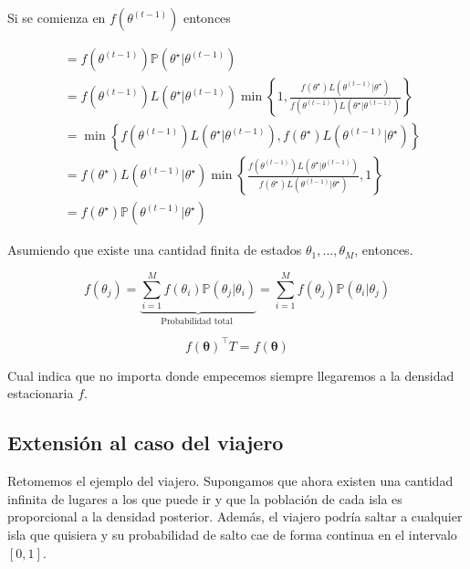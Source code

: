 \documentclass[
  12pt,
]{book}
\theoremstyle{definition}
\theoremstyle{definition}
\theoremstyle{definition}
\theoremstyle{definition}
\theoremstyle{remark}
\begin{document}
Si se comienza en \(f\left(\theta^{(t-1)}\right)\) entonces

\begin{align}
&= f\left(\theta^{(t-1)}\right) \mathbb{P}\left(\theta^{\star} | \theta^{(t-1)}\right) \\
&= f\left(\theta^{(t-1)}\right) L\left(\theta^{\star} | \theta^{(t-1)}\right) \min \left\{1, \frac{f\left(\theta^{\star}\right) L\left(\theta^{(t-1)} | \theta^{\star}\right)}{f\left(\theta^{(t-1)}\right) L\left(\theta^{\star} | \theta^{(t-1)}\right)}\right\} \\
&=\min \left\{f\left(\theta^{(t-1)}\right) L\left(\theta^{\star} | \theta^{(t-1)}\right), f\left(\theta^{\star}\right) L\left(\theta^{(t-1)} | \theta^{\star}\right)\right\} \\
&= f\left(\theta^{\star}\right) L\left(\theta^{(t-1)} | \theta^{\star}\right) \min \left\{\frac{f\left(\theta^{(t-1)}\right) L\left(\theta^{\star} | \theta^{(t-1)}\right)}{f\left(\theta^{\star}\right) L\left(\theta^{(t-1)} | \theta^{\star}\right)}, 1\right\} \\
&=f\left(\theta^{\star}\right) \mathbb{P}\left(\theta^{(t-1)} | \theta^{\star}\right)
\end{align}

Asumiendo que existe una cantidad finita de estados \(\theta_{1}, \ldots, \theta_{M}\), entonces.

\begin{equation*}
f\left(\theta_{j}\right) = \underbrace{\sum_{i=1}^{M} f\left(\theta_{i}\right) \mathbb{P} \left(\theta_{j} | \theta_{i}\right)}_{\text {Probabilidad total  }}=\sum_{i=1}^{M} f\left(\theta_{j}\right) \mathbb{P} \left(\theta_{i} | \theta_{j}\right)
\end{equation*}

\begin{equation}
f(\boldsymbol{\theta})^\top T =   f(\boldsymbol{\theta})
\end{equation}

Cual indica que no importa donde empecemos siempre llegaremos a la densidad estacionaria \(f\).

\hypertarget{extensiuxf3n-al-caso-del-viajero}{%
\subsection{Extensión al caso del viajero}\label{extensiuxf3n-al-caso-del-viajero}}

Retomemos el ejemplo del viajero. Supongamos que ahora existen una
cantidad infinita de lugares a los que puede ir y que la población de
cada isla es proporcional a la densidad posterior. Además, el viajero
podría saltar a cualquier isla que quisiera y su probabilidad de
salto cae de forma continua en el intervalo \([0,1]\).
\end{document}
